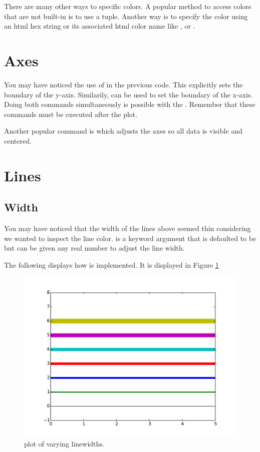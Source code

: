 There are many other ways to specific colors. A popular method to access colors that are not built-in is to use a  tuple. Another way is to specify the color using an html hex string or its associated html color name like , or . 

\section*{Axes}
You may have noticed the use of  in the previous code. This explicitly sets the boundary of the y-axis. Similarily,  can be used to set the boundary of the x-axis. 
Doing both commands simultaneously is possible with the . 
Remember that these commands must be executed after the plot. 

Another popular command is  which adjusts the axes so all data is visible and centered. 

\section*{Lines}
\subsection*{Width}
You may have noticed that the width of the lines above seemed thin considering we wanted to inspect the line color.  is a keyword argument that is defaulted to be  but can be given any real number to adjust the line width. 

The following displays how  is implemented. It is displayed in Figure \ref{linewidth}


\begin{figure} 
\includegraphics[width=\textwidth]{linewidth.pdf}
\caption{plot of varying linewidths.}
\label{linewidth} 
\end{figure}

